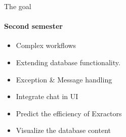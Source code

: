 \begin{frame}{The goal}
\framesubtitle{Second semester}
	\begin{itemize}
		\item Complex workflows
		\item Extending database functionality.
		\item Exception \& Message handling
		\item Integrate chat in UI
		\item Predict the efficiency of Exractors
		\item Visualize the database content
	\end{itemize}
\end{frame}
